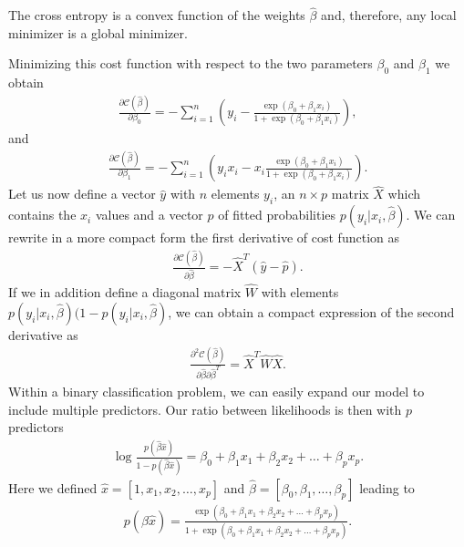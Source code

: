 \documentclass[letterpaper,10pt,english]{sphinxmanual}
\begin{document}
The cross entropy is a convex function of the weights \(\hat{\beta}\) and,
therefore, any local minimizer is a global minimizer.

Minimizing this
cost function with respect to the two parameters \(\beta_0\) and \(\beta_1\) we obtain
\begin{equation*}
\begin{split}
\frac{\partial \mathcal{C}(\hat{\beta})}{\partial \beta_0} = -\sum_{i=1}^n  \left(y_i -\frac{\exp{(\beta_0+\beta_1x_i)}}{1+\exp{(\beta_0+\beta_1x_i)}}\right),
\end{split}
\end{equation*}
and
\begin{equation*}
\begin{split}
\frac{\partial \mathcal{C}(\hat{\beta})}{\partial \beta_1} = -\sum_{i=1}^n  \left(y_ix_i -x_i\frac{\exp{(\beta_0+\beta_1x_i)}}{1+\exp{(\beta_0+\beta_1x_i)}}\right).
\end{split}
\end{equation*}
Let us now define a vector \(\hat{y}\) with \(n\) elements \(y_i\), an
\(n\times p\) matrix \(\hat{X}\) which contains the \(x_i\) values and a
vector \(\hat{p}\) of fitted probabilities \(p(y_i\vert x_i,\hat{\beta})\). We can rewrite in a more compact form the first
derivative of cost function as
\begin{equation*}
\begin{split}
\frac{\partial \mathcal{C}(\hat{\beta})}{\partial \hat{\beta}} = -\hat{X}^T\left(\hat{y}-\hat{p}\right).
\end{split}
\end{equation*}
If we in addition define a diagonal matrix \(\hat{W}\) with elements
\(p(y_i\vert x_i,\hat{\beta})(1-p(y_i\vert x_i,\hat{\beta})\), we can obtain a compact expression of the second derivative as
\begin{equation*}
\begin{split}
\frac{\partial^2 \mathcal{C}(\hat{\beta})}{\partial \hat{\beta}\partial \hat{\beta}^T} = \hat{X}^T\hat{W}\hat{X}.
\end{split}
\end{equation*}
Within a binary classification problem, we can easily expand our model to include multiple predictors. Our ratio between likelihoods is then with \(p\) predictors
\begin{equation*}
\begin{split}
\log{ \frac{p(\hat{\beta}\hat{x})}{1-p(\hat{\beta}\hat{x})}} = \beta_0+\beta_1x_1+\beta_2x_2+\dots+\beta_px_p.
\end{split}
\end{equation*}
Here we defined \(\hat{x}=[1,x_1,x_2,\dots,x_p]\) and \(\hat{\beta}=[\beta_0, \beta_1, \dots, \beta_p]\) leading to
\begin{equation*}
\begin{split}
p(\hat{\beta}\hat{x})=\frac{ \exp{(\beta_0+\beta_1x_1+\beta_2x_2+\dots+\beta_px_p)}}{1+\exp{(\beta_0+\beta_1x_1+\beta_2x_2+\dots+\beta_px_p)}}.
\end{split}
\end{equation*}
\end{document}
